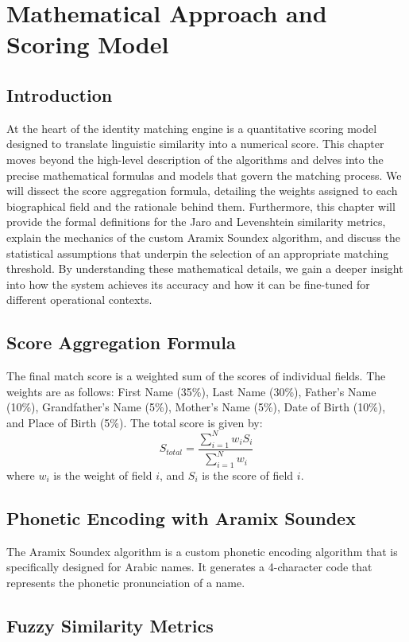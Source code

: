 \chapter{Mathematical Approach and Scoring Model}

\section{Introduction}
At the heart of the identity matching engine is a quantitative scoring model designed to translate linguistic similarity into a numerical score. This chapter moves beyond the high-level description of the algorithms and delves into the precise mathematical formulas and models that govern the matching process. We will dissect the score aggregation formula, detailing the weights assigned to each biographical field and the rationale behind them. Furthermore, this chapter will provide the formal definitions for the Jaro and Levenshtein similarity metrics, explain the mechanics of the custom Aramix Soundex algorithm, and discuss the statistical assumptions that underpin the selection of an appropriate matching threshold. By understanding these mathematical details, we gain a deeper insight into how the system achieves its accuracy and how it can be fine-tuned for different operational contexts.

\section{Score Aggregation Formula}
The final match score is a weighted sum of the scores of individual fields. The weights are as follows: First Name (35\%), Last Name (30\%), Father's Name (10\%), Grandfather's Name (5\%), Mother's Name (5\%), Date of Birth (10\%), and Place of Birth (5\%). The total score is given by:
\[
S_{total} = \frac{\sum_{i=1}^{N} w_i S_i}{\sum_{i=1}^{N} w_i}
\]
where $w_i$ is the weight of field $i$, and $S_i$ is the score of field $i$.

\section{Phonetic Encoding with Aramix Soundex}
The Aramix Soundex algorithm is a custom phonetic encoding algorithm that is specifically designed for Arabic names. It generates a 4-character code that represents the phonetic pronunciation of a name.

\section{Fuzzy Similarity Metrics}
